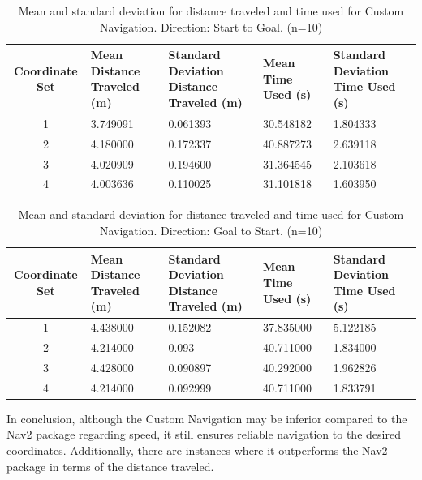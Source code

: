 \documentclass[%
paper=A4,               %
twoside=true,           %
openright,              %
11pt,                   %
bibliography=totoc,     %
titlepage=on,           %
DIV=12,                 %
BCOR=1.5cm,             %
parskip=half,            %
final
]{scrreprt}
\begin{document}
\begin{table}[h!]
	\centering
	\small %
	\begin{tabular}{|c|p{3cm}|p{3cm}|p{3cm}|p{3cm}|}
		\hline
		Coordinate Set & Mean Distance  Traveled (m) & Standard Deviation Distance  Traveled (m) & Mean Time  Used (s) & Standard Deviation  Time Used (s) \\
		\hline
		1 & 3.749091 & 0.061393 & 30.548182 & 1.804333 \\
		2 & 4.180000 & 0.172337 & 40.887273 & 2.639118 \\
		3 & 4.020909 & 0.194600 & 31.364545 & 2.103618 \\
		4 & 4.003636 & 0.110025 & 31.101818 & 1.603950 \\
		\hline
	\end{tabular}
	\caption{Mean and standard deviation for distance traveled and time used for Custom Navigation. Direction: Start to Goal. (n=10)}
	\label{tab:start_goal}
\end{table}
	\begin{table}[h!]
		\centering
		\small %
		\begin{tabular}{|c|p{3cm}|p{3cm}|p{3cm}|p{3cm}|}
			\hline
			Coordinate Set & Mean Distance Traveled (m) & Standard Deviation Distance Traveled (m) & Mean Time Used (s) & Standard Deviation Time Used (s) \\
			\hline
			1 & 4.438000 & 0.152082 & 37.835000 & 5.122185 \\
			2 & 4.214000 & 0.093 & 40.711000 & 1.834000 \\
			3 & 4.428000 & 0.090897 & 40.292000 & 1.962826 \\
			4 & 4.214000 & 0.092999 & 40.711000 & 1.833791 \\
			\hline
		\end{tabular}
		\caption{Mean and standard deviation for distance traveled and time used for Custom Navigation. Direction: Goal to Start. (n=10)}
		\label{tab:goal_start}
	\end{table}
	\newline
	In conclusion, although the Custom Navigation may be inferior compared to the Nav2 package regarding speed, it still ensures reliable navigation to the desired coordinates. Additionally, there are instances where it outperforms the Nav2 package in terms of the distance traveled.
	
	
\end{document}
